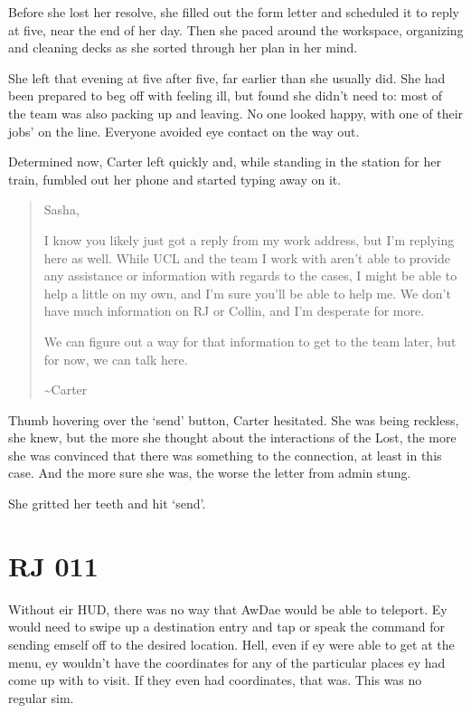 Before she lost her resolve, she filled out the form letter and scheduled it to reply at five, near the end of her day. Then she paced around the workspace, organizing and cleaning decks as she sorted through her plan in her mind.

She left that evening at five after five, far earlier than she usually did. She had been prepared to beg off with feeling ill, but found she didn't need to: most of the team was also packing up and leaving. No one looked happy, with one of their jobs' on the line. Everyone avoided eye contact on the way out.

Determined now, Carter left quickly and, while standing in the station for her train, fumbled out her phone and started typing away on it.

\begin{quote}
Sasha,

I know you likely just got a reply from my work address, but I'm replying here as well. While UCL and the team I work with aren't able to provide any assistance or information with regards to the cases, I might be able to help a little on my own, and I'm sure you'll be able to help me. We don't have much information on RJ or Collin, and I'm desperate for more.

We can figure out a way for that information to get to the team later, but for now, we can talk here.

\textasciitilde{}Carter
\end{quote}

Thumb hovering over the `send' button, Carter hesitated. She was being reckless, she knew, but the more she thought about the interactions of the Lost, the more she was convinced that there was something to the connection, at least in this case. And the more sure she was, the worse the letter from admin stung.

She gritted her teeth and hit `send'.

\chapter*{RJ 011}

Without eir HUD, there was no way that AwDae would be able to teleport. Ey would need to swipe up a destination entry and tap or speak the command for sending emself off to the desired location. Hell, even if ey were able to get at the menu, ey wouldn't have the coordinates for any of the particular places ey had come up with to visit. If they even had coordinates, that was. This was no regular sim.


